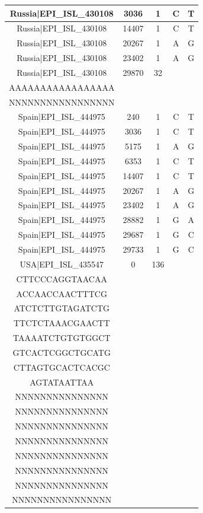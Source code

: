 \documentclass[a4paper,10pt]{article}
\begin{document}
\begin{longtable}{@{}ccccc@{}}
Russia|EPI\_ISL\_430108 & 3036 & 1 & C & T \\* \midrule
Russia|EPI\_ISL\_430108 & 14407 & 1 & C & T \\* \midrule
Russia|EPI\_ISL\_430108 & 20267 & 1 & A & G \\* \midrule
Russia|EPI\_ISL\_430108 & 23402 & 1 & A & G \\* \midrule
Russia|EPI\_ISL\_430108 & 29870 & 32 & \begin{tabular}[c]{@{}c@{}}AAAAAAAAAAAAAAA\\ AAAAAAAAAAAAAAAAA\end{tabular} & \begin{tabular}[c]{@{}c@{}}NNNNNNNNNNNNNNN\\ NNNNNNNNNNNNNNNNN\end{tabular} \\* \midrule
Spain|EPI\_ISL\_444975 & 240 & 1 & C & T \\* \midrule
Spain|EPI\_ISL\_444975 & 3036 & 1 & C & T \\* \midrule
Spain|EPI\_ISL\_444975 & 5175 & 1 & A & G \\* \midrule
Spain|EPI\_ISL\_444975 & 6353 & 1 & C & T \\* \midrule
Spain|EPI\_ISL\_444975 & 14407 & 1 & C & T \\* \midrule
Spain|EPI\_ISL\_444975 & 20267 & 1 & A & G \\* \midrule
Spain|EPI\_ISL\_444975 & 23402 & 1 & A & G \\* \midrule
Spain|EPI\_ISL\_444975 & 28882 & 1 & G & A \\* \midrule
Spain|EPI\_ISL\_444975 & 29687 & 1 & G & C \\* \midrule
Spain|EPI\_ISL\_444975 & 29733 & 1 & G & C \\* \midrule
USA|EPI\_ISL\_435547 & 0 & 136 & \begin{tabular}[c]{@{}c@{}}ATTAAAGGTTTATAC\\ CTTCCCAGGTAACAA\\ ACCAACCAACTTTCG\\ ATCTCTTGTAGATCTG\\ TTCTCTAAACGAACTT\\ TAAAATCTGTGTGGCT\\ GTCACTCGGCTGCATG\\ CTTAGTGCACTCACGC\\ AGTATAATTAA\end{tabular} & \begin{tabular}[c]{@{}c@{}}NNNNNNNNNNNNNNN\\ NNNNNNNNNNNNNNN\\ NNNNNNNNNNNNNNN\\ NNNNNNNNNNNNNNN\\ NNNNNNNNNNNNNNN\\ NNNNNNNNNNNNNNN\\ NNNNNNNNNNNNNNN\\ NNNNNNNNNNNNNNN\\ NNNNNNNNNNNNNNNN\end{tabular} \\* \midrule

\end{longtable}
\end{document}
